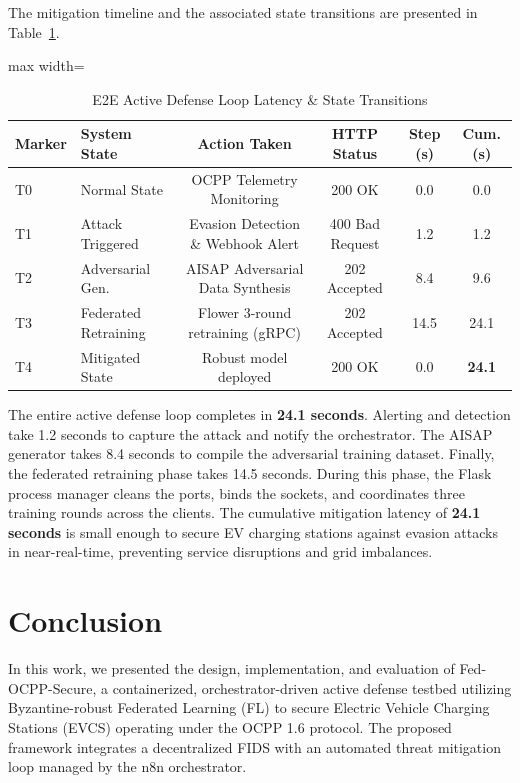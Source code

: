 \documentclass[10pt, a4paper, conference]{IEEEtran}
\begin{document}
The mitigation timeline and the associated state transitions are presented in Table~\ref{tab:latency_timeline}.

\begin{table}[htbp]
\centering
\caption{E2E Active Defense Loop Latency \& State Transitions}
\label{tab:latency_timeline}
\begin{adjustbox}{max width=\columnwidth}
\begin{tabular}{llcccc}
\hline
\textbf{Marker} & \textbf{System State} & \textbf{Action Taken} & \textbf{HTTP Status} & \textbf{Step (s)} & \textbf{Cum. (s)} \\ \hline
T0 & Normal State & OCPP Telemetry Monitoring & 200 OK & 0.0 & 0.0 \\
T1 & Attack Triggered & Evasion Detection \& Webhook Alert & 400 Bad Request & 1.2 & 1.2 \\
T2 & Adversarial Gen. & AISAP Adversarial Data Synthesis & 202 Accepted & 8.4 & 9.6 \\
T3 & Federated Retraining & Flower 3-round retraining (gRPC) & 202 Accepted & 14.5 & 24.1 \\
T4 & Mitigated State & Robust model deployed & 200 OK & 0.0 & \textbf{24.1} \\ \hline
\end{tabular}
\end{adjustbox}
\end{table}

The entire active defense loop completes in \textbf{24.1 seconds}. Alerting and detection take 1.2 seconds to capture the attack and notify the orchestrator. The AISAP generator takes 8.4 seconds to compile the adversarial training dataset. Finally, the federated retraining phase takes 14.5 seconds. During this phase, the Flask process manager cleans the ports, binds the sockets, and coordinates three training rounds across the clients. The cumulative mitigation latency of \textbf{24.1 seconds} is small enough to secure EV charging stations against evasion attacks in near-real-time, preventing service disruptions and grid imbalances.

\section{Conclusion} \label{sec:conclusion}
In this work, we presented the design, implementation, and evaluation of Fed-OCPP-Secure, a containerized, orchestrator-driven active defense testbed utilizing Byzantine-robust Federated Learning (FL) to secure Electric Vehicle Charging Stations (EVCS) operating under the OCPP 1.6 protocol. The proposed framework integrates a decentralized FIDS with an automated threat mitigation loop managed by the n8n orchestrator. 
\end{document}
